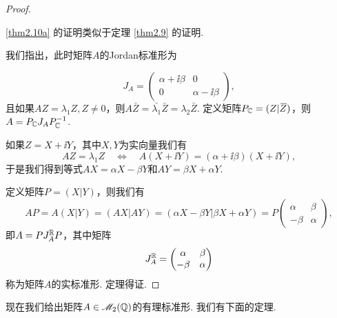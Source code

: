 \begin{proof}
  \begin{enuma}
    \item \ref{thm2.10a} 的证明类似于定理 \ref{thm2.9} 的证明.
    \item 我们指出，此时矩阵$A$的Jordan标准形为
  \end{enuma}
        \[
          J_A = \begin{pmatrix}
            \alpha + \ii\beta & 0 \\
            0 & \alpha - \ii\beta
          \end{pmatrix},
        \]
  且如果$AZ=\lambda_1Z,Z\ne0$，则$A\bar Z=\bar{\lambda_1}\bar Z=\lambda_2\bar Z$. 定义矩阵$P_{\mathbb C}=(Z|{}\mkern2mu\overline{\mkern-2muZ})$，则$A=P_{\mathbb C}J_AP_{\mathbb C}^{-1}$.

  如果$Z=X+\ii Y$，其中$X,Y$为实向量我们有
  \[
    AZ = \lambda_1Z \quad \Leftrightarrow\quad
    A(X + \ii Y) = (\alpha + \ii\beta )(X + \ii Y),
  \]
  于是我们得到等式$AX=\alpha X-\beta Y$和$AY=\beta X+\alpha Y$.

  定义矩阵$P=(X|Y)$，则我们有
  \[
    AP = A(X|Y) = (AX|AY) = (\alpha X-\beta Y|\beta X+\alpha Y) = P\begin{pmatrix}
      \alpha & \beta \\
      -\beta & \alpha
    \end{pmatrix},
  \]
  即$A=PJ_A^{\mathbb R}P$，其中矩阵
  \[
    J_A^{\mathbb R} = \begin{pmatrix}
      \alpha & \beta \\
      -\beta & \alpha
    \end{pmatrix}
  \]
  称为矩阵$A$的{\kaishu 实标准形}. 定理得证.
\end{proof}

现在我们给出矩阵$A\in\mathscr M_2(\mathbb Q)$的有理标准形. 我们有下面的定理.

